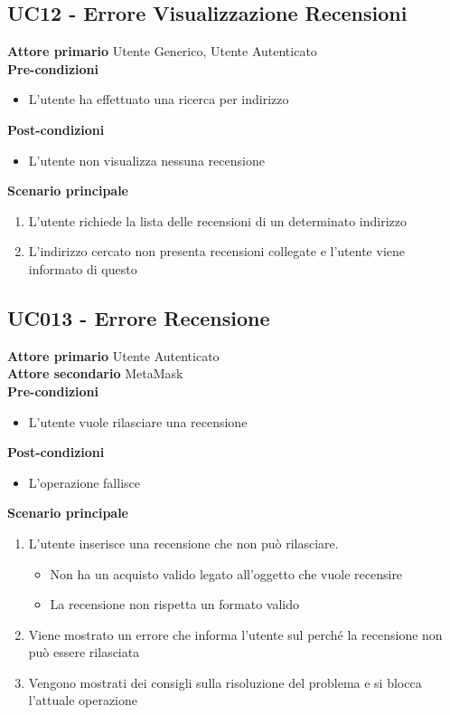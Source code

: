\subsection{UC12 - Errore Visualizzazione Recensioni}
\label{UC12}
\textbf{Attore primario} Utente Generico, Utente Autenticato \\
\textbf{Pre-condizioni}
\begin{itemize}
    \item L'utente ha effettuato una ricerca per indirizzo
\end{itemize}
\textbf{Post-condizioni}
\begin{itemize}
    \item  L'utente non visualizza nessuna recensione
\end{itemize}
\textbf{Scenario principale}
\begin{enumerate}
    \item L'utente richiede la lista delle recensioni di un determinato indirizzo
    \item L'indirizzo cercato non presenta recensioni collegate e l'utente viene
          informato di questo
\end{enumerate}

\subsection{UC013 - Errore Recensione}
\label{UC13}
\textbf{Attore primario} Utente Autenticato \\
\textbf{Attore secondario} MetaMask \\
\textbf{Pre-condizioni}
\begin{itemize}
    \item L'utente vuole rilasciare una recensione
\end{itemize}
\textbf{Post-condizioni}
\begin{itemize}
    \item L'operazione fallisce
\end{itemize}
\textbf{Scenario principale}
\begin{enumerate}
    \item L'utente inserisce una recensione che non può rilasciare.
          \begin{itemize}
              \item Non ha un acquisto valido legato all'oggetto che vuole recensire
              \item La recensione non rispetta un formato valido
          \end{itemize}
    \item Viene mostrato un errore che informa l'utente sul perché la recensione non può
          essere rilasciata
    \item Vengono mostrati dei consigli sulla risoluzione del problema e si blocca
          l'attuale operazione
\end{enumerate}

